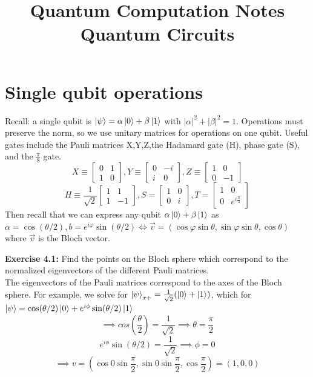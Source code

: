 \documentclass{article}
\title{Quantum Computation Notes \\ \large Quantum Circuits}
\author{}
\date{}
\begin{document}
\maketitle
\vspace{-2cm}
\tableofcontents
\section{Single qubit operations}
Recall: a single qubit is $\ket{\psi} = \alpha \ket0 + \beta \ket1$ with $|\alpha|^2 + |\beta|^2 = 1$. Operations must preserve the norm, so we use unitary matrices for operations on one qubit. Useful gates include the Pauli matrices X,Y,Z,the Hadamard gate (H), phase gate (S), and the $\frac{\pi}{8}$ gate.
$$X \equiv \begin{bmatrix} 0 & 1 \\ 1 & 0\end{bmatrix}, Y \equiv \begin{bmatrix} 0 & -i \\ i & 0 \end{bmatrix}, Z \equiv \begin{bmatrix} 1 & 0 \\ 0 & -1\end{bmatrix}$$
$$H \equiv \frac{1}{\sqrt2}\begin{bmatrix} 1& 1 \\ 1 & -1\end{bmatrix}, S = \begin{bmatrix} 1 & 0 \\ 0 & i\end{bmatrix}, T = \begin{bmatrix} 1 & 0 \\ 0 & e^{i\frac{\pi}{4}}\end{bmatrix}$$
Then recall that we can express any qubit $\alpha \ket0 + \beta \ket1$ as $\alpha = \cos(\theta/2), b = e^{i\varphi} \sin(\theta/2) \iff \vec{v} = (\cos \varphi \sin \theta, \sin\varphi \sin \theta, \cos \theta)$ where $\vec{v}$ is the Bloch vector. 
\begin{tcolorbox}\textbf{Exercise 4.1:}
 Find the points on the Bloch sphere which correspond to the normalized eigenvectors of the different Pauli matrices.\\
The eigenvectors of the Pauli matrices correspond to the axes of the Bloch sphere.
	For example, we solve for $\ket{\psi}_{x+} = \frac{1}{\sqrt2}(\ket0 + \ket1)$, which for $\ket{\psi} = \cos(\theta/2)\ket0 + e^{i \phi} \sin(\theta/2)\ket{1}$
$$\implies cos (\frac{\theta}{2}) = \frac{1}{\sqrt{2}} \implies \theta = \frac{\pi}{2}$$
$$e^{i\phi} \sin(\theta/2) = \frac{1}{\sqrt{2}} \implies \phi = 0$$
$$\implies v = (\cos 0 \sin \frac{\pi}{2}, \sin 0 \sin \frac{\pi}{2}, \cos{\frac{\pi}{2}}) = (1,0,0)$$
\end{tcolorbox}
\end{document}
